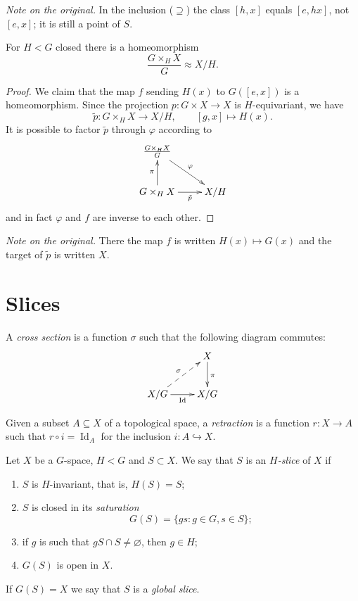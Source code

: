 \noindent
{\it Note on the original.} In the
inclusion ($\supseteq$) the class
$[h,x]$ equals $[e,hx]$, not $[e,x]$;
it is still a point of $S$.

\begin{proposition}
\label{proposition-twisted-orbit-space}
For $H<G$ closed there is a
homeomorphism
$$
\frac{G\times_HX}{G}\approx X/H.
$$
\end{proposition}

\begin{proof}
We claim that the map $f$ sending
$H(x)$ to $G([e,x])$ is a
homeomorphism. Since the projection
$p:G\times X\to X$ is $H$-equivariant,
we have
$$
\tilde{p}:G\times_HX\to X/H,
\qquad
[g,x]\mapsto H(x).
$$
It is possible to factor $\tilde{p}$
through $\varphi$ according to
$$
\xymatrix{
\frac{G\times_HX}{G}
  \ar[rd]^{\varphi} \\
G\times_HX \ar[u]^{\pi}
  \ar[r]_-{\tilde{p}}
  & X/H
}
$$
and in fact $\varphi$ and $f$ are
inverse to each other.
\end{proof}

\noindent
{\it Note on the original.} There the
map $f$ is written
$H(x)\mapsto G(x)$ and the target of
$\tilde{p}$ is written $X$.

\section{Slices}
\label{section-slices}

\begin{definition}
\label{definition-cross-section}
A {\it cross section} is a function
$\sigma$ such that the following
diagram commutes:
$$
\xymatrix{
& X \ar[d]^{\pi} \\
X/G \ar[r]_-{\operatorname{Id}}
  \ar@{-->}[ur]^{\sigma}
  & X/G
}
$$
\end{definition}

\begin{definition}
\label{definition-retraction}
Given a subset $A\subseteq X$ of a
topological space, a {\it retraction}
is a function $r:X\to A$ such that
$r\circ i=\operatorname{Id}_A$ for the
inclusion $i:A\hookrightarrow X$.
\end{definition}

\begin{definition}
\label{definition-slice}
Let $X$ be a $G$-space, $H<G$ and
$S\subset X$. We say that $S$ is an
{\it $H$-slice} of $X$ if
\begin{enumerate}
\item $S$ is $H$-invariant, that is,
$H(S)=S$;
\item $S$ is closed in its
{\it saturation}
$$
G(S)=\{gs:g\in G,s\in S\};
$$
\item if $g$ is such that
$gS\cap S\neq\varnothing$, then
$g\in H$;
\item $G(S)$ is open in $X$.
\end{enumerate}
If $G(S)=X$ we say that $S$ is a
{\it global slice}.
\end{definition}

